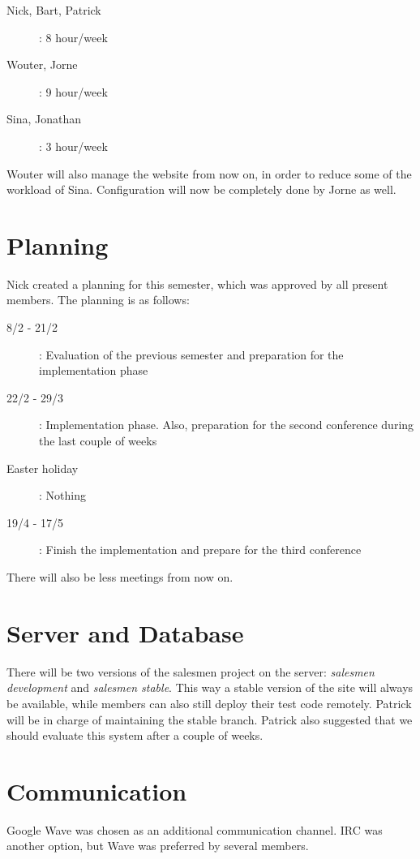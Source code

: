 \documentclass[a4paper, 12pt]{article}
\begin{document}
	\begin{description}
		\item[Nick, Bart, Patrick]: 8 hour/week
		\item[Wouter, Jorne]: 9 hour/week
		\item[Sina, Jonathan]: 3 hour/week
	\end{description}
	
Wouter will also manage the website from now on, in order to reduce some of the workload of Sina. Configuration will now be completely done by Jorne as well.

\section{Planning}
	Nick created a planning for this semester, which was approved by all present members. The planning is as follows:
	
	\begin{description}
		\item[8/2 - 21/2]: Evaluation of the previous semester and preparation for the implementation phase
		\item[22/2 - 29/3]: Implementation phase. Also, preparation for the second conference during the last couple of weeks
		\item[Easter holiday]: Nothing
		\item[19/4 - 17/5]: Finish the implementation and prepare for the third conference
	\end{description}
	
	There will also be less meetings from now on. 

\section{Server and Database}
	There will be two versions of the salesmen project on the server: \textit{salesmen development} and \textit{salesmen stable}. This way a stable version of the site will always be available, while members can also still deploy their test code remotely. Patrick will be in charge of maintaining the stable branch. Patrick also suggested that we should evaluate this system after a couple of weeks.
	
\section{Communication}
	Google Wave was chosen as an additional communication channel. IRC was another option, but Wave was preferred by several members. 
			
\end{document}
